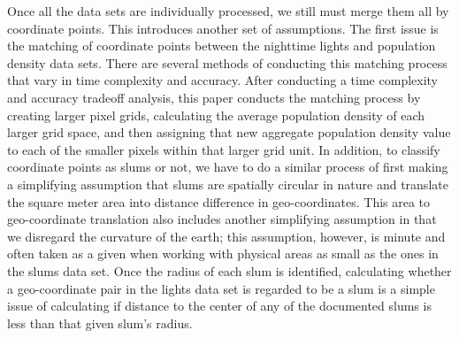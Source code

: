 Once all the data sets are individually processed, we still must merge them all by coordinate points. This introduces another set of assumptions. The first issue is the matching of coordinate points between the nighttime lights and population density data sets. There are several methods of conducting this matching process that vary in time complexity and accuracy. After conducting a time complexity and accuracy tradeoff analysis, this paper conducts the matching process by creating larger pixel grids, calculating the average population density of each larger grid space, and then assigning that new aggregate population density value to each of the smaller pixels within that larger grid unit. In addition, to classify coordinate points as slums or not, we have to do a similar process of first making a simplifying assumption that slums are spatially circular in nature and translate the square meter area into distance difference in geo-coordinates. This area to geo-coordinate translation also includes another simplifying assumption in that we disregard the curvature of the earth; this assumption, however, is minute and often taken as a given when working with physical areas as small as the ones in the slums data set. Once the radius of each slum is identified, calculating whether a geo-coordinate pair in the lights data set is regarded to be a slum is a simple issue of calculating if distance to the center of any of the documented slums is less than that given slum's radius.






